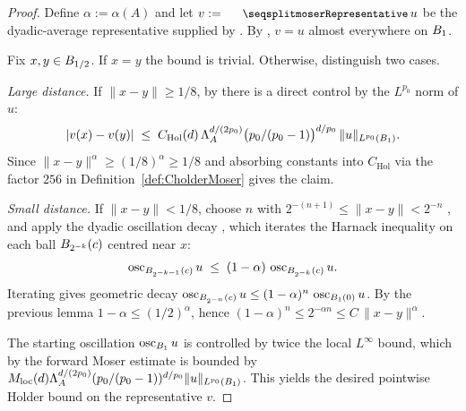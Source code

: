 \begin{proof}
\leanok
{}

Define $\alpha := \alpha(A)$ and let $v := \leanname{moserRepresentative}\,u$
be the dyadic-average representative supplied by
. By
, $v = u$ almost everywhere on $B_{1}$.

Fix $x, y \in B_{1/2}$. If $x = y$ the bound is trivial. Otherwise,
distinguish two cases.

\emph{Large distance.} If $\|x - y\| \geq 1/8$, by
 there is a direct
control by the $L^{p_0}$ norm of $u$:
\begin{equation*}
  |v(x) - v(y)| \;\leq\; C_{\mathrm{Hol}}(d)\,\Lambda_A^{d/(2p_0)}
    \bigl(p_0/(p_0-1)\bigr)^{d/p_0}\,\|u\|_{L^{p_0}(B_{1})}.
\end{equation*}
Since $\|x-y\|^\alpha \geq (1/8)^\alpha \geq 1/8$ and absorbing constants
into $C_{\mathrm{Hol}}$ via the factor $256$ in
Definition~\ref{def:CholderMoser} gives the claim.

\emph{Small distance.} If $\|x - y\| < 1/8$, choose $n$ with
$2^{-(n+1)} \leq \|x - y\| < 2^{-n}$ ,
and apply the dyadic oscillation decay
, which iterates the Harnack
inequality on each ball $B_{2^{-k}}(c)$ centred near $x$:
\begin{equation*}
  \operatorname{osc}_{B_{2^{-k-1}}(c)} u
    \;\leq\; (1 - \alpha)\,\operatorname{osc}_{B_{2^{-k}}(c)} u.
\end{equation*}
Iterating gives geometric decay
$\operatorname{osc}_{B_{2^{-n}}(c)} u \leq (1-\alpha)^n\,\operatorname{osc}_{B_{1}(0)} u$.
By the previous lemma $1 - \alpha \leq (1/2)^\alpha$, hence
$(1-\alpha)^n \leq 2^{-\alpha n} \leq C\,\|x - y\|^\alpha$.

The starting oscillation $\operatorname{osc}_{B_{1}} u$ is controlled by twice the local
$L^\infty$ bound, which by the forward Moser estimate
 is bounded by
$M_{\mathrm{loc}}(d)\Lambda_A^{d/(2p_0)} (p_0/(p_0-1))^{d/p_0}
        \|u\|_{L^{p_0}(B_{1})}$.
This yields the desired pointwise Holder bound on the representative $v$.
\end{proof}

